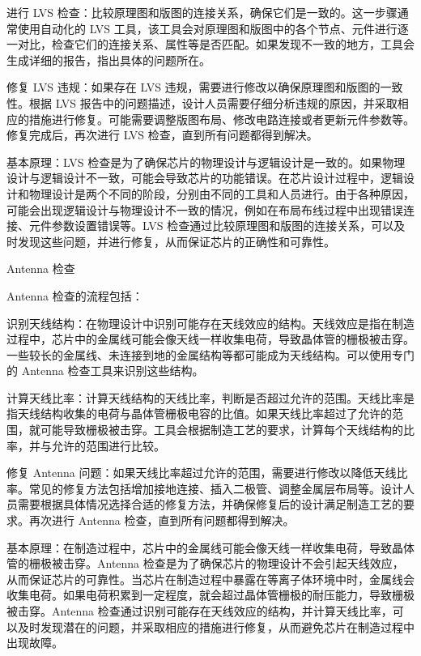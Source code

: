 进行 LVS 检查：比较原理图和版图的连接关系，确保它们是一致的。这一步骤通常使用自动化的 LVS 工具，该工具会对原理图和版图中的各个节点、元件进行逐一对比，检查它们的连接关系、属性等是否匹配。如果发现不一致的地方，工具会生成详细的报告，指出具体的问题所在。

修复 LVS 违规：如果存在 LVS 违规，需要进行修改以确保原理图和版图的一致性。根据 LVS 报告中的问题描述，设计人员需要仔细分析违规的原因，并采取相应的措施进行修复。可能需要调整版图布局、修改电路连接或者更新元件参数等。修复完成后，再次进行 LVS 检查，直到所有问题都得到解决。

基本原理：LVS 检查是为了确保芯片的物理设计与逻辑设计是一致的。如果物理设计与逻辑设计不一致，可能会导致芯片的功能错误。在芯片设计过程中，逻辑设计和物理设计是两个不同的阶段，分别由不同的工具和人员进行。由于各种原因，可能会出现逻辑设计与物理设计不一致的情况，例如在布局布线过程中出现错误连接、元件参数设置错误等。LVS 检查通过比较原理图和版图的连接关系，可以及时发现这些问题，并进行修复，从而保证芯片的正确性和可靠性。

Antenna 检查

Antenna 检查的流程包括：

识别天线结构：在物理设计中识别可能存在天线效应的结构。天线效应是指在制造过程中，芯片中的金属线可能会像天线一样收集电荷，导致晶体管的栅极被击穿。一些较长的金属线、未连接到地的金属结构等都可能成为天线结构。可以使用专门的 Antenna 检查工具来识别这些结构。

计算天线比率：计算天线结构的天线比率，判断是否超过允许的范围。天线比率是指天线结构收集的电荷与晶体管栅极电容的比值。如果天线比率超过了允许的范围，就可能导致栅极被击穿。工具会根据制造工艺的要求，计算每个天线结构的比率，并与允许的范围进行比较。

修复 Antenna 问题：如果天线比率超过允许的范围，需要进行修改以降低天线比率。常见的修复方法包括增加接地连接、插入二极管、调整金属层布局等。设计人员需要根据具体情况选择合适的修复方法，并确保修复后的设计满足制造工艺的要求。再次进行 Antenna 检查，直到所有问题都得到解决。

基本原理：在制造过程中，芯片中的金属线可能会像天线一样收集电荷，导致晶体管的栅极被击穿。Antenna 检查是为了确保芯片的物理设计不会引起天线效应，从而保证芯片的可靠性。当芯片在制造过程中暴露在等离子体环境中时，金属线会收集电荷。如果电荷积累到一定程度，就会超过晶体管栅极的耐压能力，导致栅极被击穿。Antenna 检查通过识别可能存在天线效应的结构，并计算天线比率，可以及时发现潜在的问题，并采取相应的措施进行修复，从而避免芯片在制造过程中出现故障。
